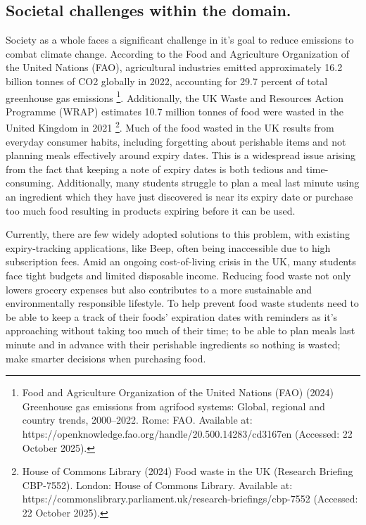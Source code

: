 \subsection{Societal challenges within the domain.}
Society as a whole faces a significant challenge in it's goal to reduce emissions to combat climate change. According to the Food and Agriculture Organization of the United Nations (FAO), agricultural industries emitted approximately 16.2 billion tonnes of CO2 globally in 2022, accounting for 29.7 percent of total greenhouse gas emissions \footnote{Food and Agriculture Organization of the United Nations (FAO) (2024) Greenhouse gas emissions from agrifood systems: Global, regional and country trends, 2000–2022. Rome: FAO. Available at: https://openknowledge.fao.org/handle/20.500.14283/cd3167en
 (Accessed: 22 October 2025).}. Additionally, the UK Waste and Resources Action Programme (WRAP) estimates 10.7 million tonnes of food were wasted in the United Kingdom in 2021 \footnote{House of Commons Library (2024) Food waste in the UK (Research Briefing CBP-7552). London: House of Commons Library. Available at: https://commonslibrary.parliament.uk/research-briefings/cbp-7552
 (Accessed: 22 October 2025).}. Much of the food wasted in the UK results from everyday consumer habits, including forgetting about perishable items and not planning meals effectively around expiry dates. This is a widespread issue arising from the fact that keeping a note of expiry dates is both tedious and time-consuming. Additionally, many students struggle to plan a meal last minute using an ingredient which they have just discovered is near its expiry date or purchase too much food resulting in products expiring before it can be used. 

Currently, there are few widely adopted solutions to this problem, with existing expiry-tracking applications, like Beep, often being inaccessible due to high subscription fees. Amid an ongoing cost-of-living crisis in the UK, many students face tight budgets and limited disposable income. Reducing food waste not only lowers grocery expenses but also contributes to a more sustainable and environmentally responsible lifestyle.  To help prevent food waste students need to be able to keep a track of their foods' expiration dates with reminders as it's approaching without taking too much of their time; to be able to plan meals last minute and in advance with their perishable ingredients so nothing is wasted; make smarter decisions when purchasing food.
\par

